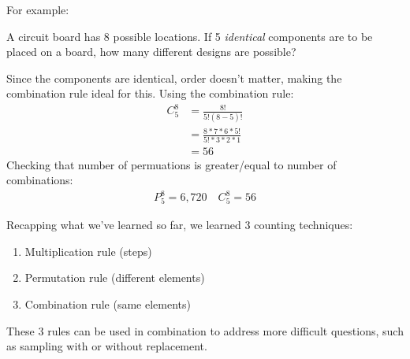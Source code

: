 \documentclass[../INDE315.tex]{subfiles}
\begin{document}
For example:
\begin{exmp}
    A circuit board has 8 possible locations. If 5 \emph{identical} components are to be placed on a board, how many different designs are possible?
\end{exmp}
Since the components are identical, order doesn't matter, making the combination rule ideal for this. Using the combination rule:
\begin{equation*}
    \begin{aligned}
        C^8_5 &= \frac{8!}{5!(8-5)!} \\
                &= \frac{8*7*6*5!}{5!*3*2*1} \\
                &= 56
    \end{aligned}
\end{equation*}
Checking that number of permuations is greater/equal to number of combinations:
\begin{equation*}
    \begin{aligned}
        P^8_5 = 6,720 \quad C^8_5 = 56
    \end{aligned}
\end{equation*}

Recapping what we've learned so far, we learned 3 counting techniques:
\begin{enumerate}
    \item Multiplication rule (steps)
    \item Permutation rule (different elements)
    \item Combination rule (same elements)
\end{enumerate}
These 3 rules can be used in combination to address more difficult questions, such as sampling with or without replacement.
\end{document}

